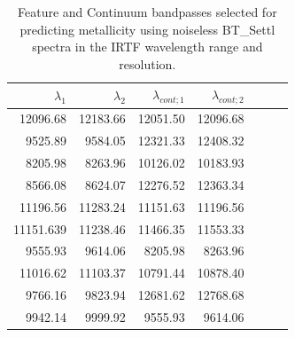%
% 
\begin{table}
\begin{center}
\begin{tabular}{rrrrrrr}
  \hline
  $\lambda_1$ & $\lambda_2$ & $\lambda_{cont;1}$ & $\lambda_{cont;2} $ \\ 
  \hline
     12096.68 & 12183.66  & 12051.50 & 12096.68 \\
     9525.89 & 9584.05 	  & 12321.33 & 12408.32 \\
     8205.98 & 8263.96 	  & 10126.02 & 10183.93 \\
     8566.08 & 8624.07 	  & 12276.52 & 12363.34 \\
     11196.56 & 11283.24  & 11151.63 & 11196.56 \\
     11151.639 & 11238.46 & 11466.35 & 11553.33 \\
     9555.93 & 9614.06 	  & 8205.98  & 8263.96 \\
     11016.62 & 11103.37  & 10791.44 & 10878.40 \\
     9766.16 & 9823.94 	  & 12681.62 & 12768.68 \\
     9942.14 & 9999.92   & 9555.93  & 9614.06 \\
\hline
\end{tabular}
\caption {Feature and Continuum bandpasses selected for predicting
  metallicity using noiseless BT\_Settl spectra in the IRTF wavelength
  range and resolution.} \label{tab:irtf-met-noiseless}
\end{center}
\end{table}

